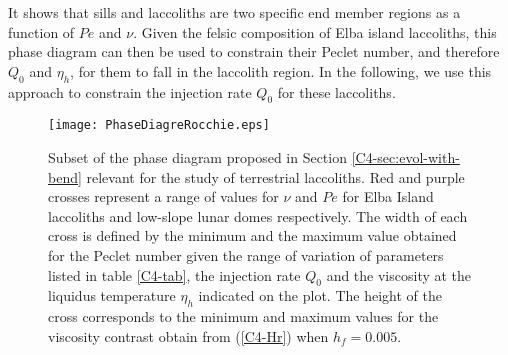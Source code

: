 It shows that sills and laccoliths are two specific end member regions
as a function of $Pe$ and  $\nu$. Given the felsic composition of Elba
island laccoliths,  this phase diagram  can then be used  to constrain
their Peclet  number, and  therefore $Q_0$ and  $\eta_h$, for  them to
fall in the laccolith region.  In  the following, we use this approach
to constrain the injection rate $Q_0$ for these laccoliths.
\begin{figure}[h!]
  \begin{center}
    \graphicspath{ {/Users/thorey/Documents/These/Projet/Refroidissement/Skin_Model/Figure/Figure_Heating/} }
    \texttt{[image: PhaseDiagreRocchie.eps]}
    \caption{Subset  of   the  phase   diagram  proposed   in  Section
      \ref{C4-sec:evol-with-bend}   relevant   for    the   study   of
      terrestrial laccoliths. Red and purple crosses represent a range
      of  values for  $\nu$ and  $Pe$  for Elba  Island laccoliths  and
      low-slope lunar domes  respectively. The width of  each cross is
      defined by  the minimum and  the maximum value obtained  for the
      Peclet number given the range  of variation of parameters listed
      in  table  \ref{C4-tab},  the   injection  rate  $Q_0$  and  the
      viscosity at the liquidus  temperature $\eta_h$ indicated on the
      plot. The  height of  the cross corresponds  to the  minimum and
      maximum   values  for   the  viscosity   contrast  obtain   from
      (\ref{C4-Hr}) when $h_f=0.005$.}
    \label{C4-PhaseDiag}
  \end{center}
\end{figure}

